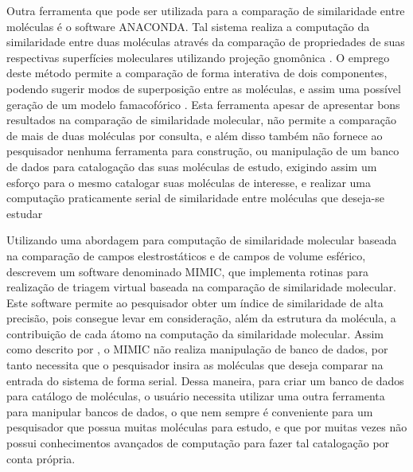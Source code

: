 Outra ferramenta que pode ser utilizada para a comparação de similaridade entre moléculas é o software ANACONDA. Tal sistema realiza a computação da similaridade entre duas moléculas através da comparação de propriedades de suas respectivas superfícies moleculares utilizando projeção gnomônica . O emprego deste método permite	 a comparação de forma interativa de dois componentes, podendo sugerir modos de superposição entre as moléculas, e assim uma possível geração de um modelo famacofórico \cite{devillers1996}. Esta ferramenta apesar de apresentar bons resultados na comparação de similaridade molecular, não permite a comparação de mais de duas moléculas por consulta, e além disso também não fornece ao pesquisador nenhuma ferramenta para construção, ou manipulação de um banco de dados para catalogação das suas moléculas de estudo, exigindo assim um esforço para o mesmo catalogar suas moléculas de interesse, e realizar uma computação praticamente serial de similaridade entre moléculas que deseja-se estudar 

Utilizando uma abordagem para computação de similaridade molecular baseada na comparação de campos elestrostáticos e de campos de volume esférico,  descrevem um software denominado MIMIC, que implementa rotinas para realização de triagem virtual baseada na comparação de similaridade molecular. Este software permite ao pesquisador obter um índice de similaridade de alta precisão, pois consegue levar em consideração, além da estrutura da molécula, a contribuição de cada átomo na computação da similaridade molecular. Assim como descrito por , o MIMIC não realiza manipulação de banco de dados, por tanto necessita que o pesquisador insira as moléculas que deseja comparar na entrada do sistema de forma serial. Dessa maneira, para criar um banco de dados para catálogo de moléculas, o usuário necessita utilizar uma outra ferramenta para manipular bancos de dados, o que nem sempre é conveniente para um pesquisador que possua muitas moléculas para estudo, e que por muitas vezes não possui conhecimentos avançados de computação para fazer tal catalogação por conta própria.

